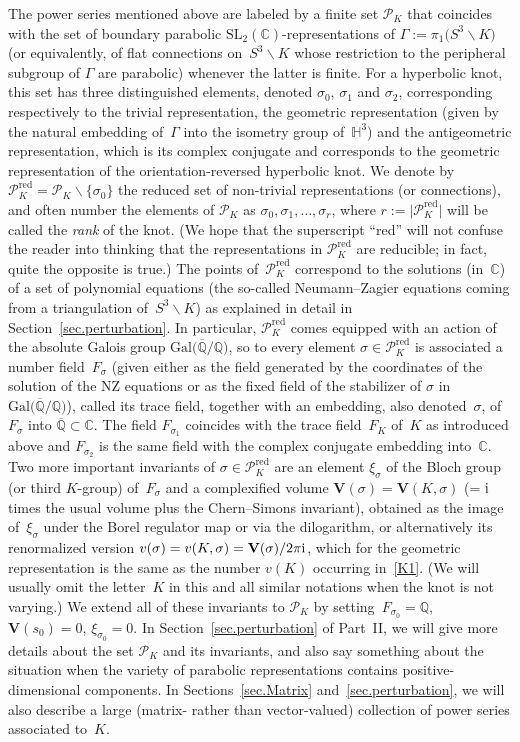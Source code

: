 \documentclass[pdftex]{sigma}
\numberwithin{equation}{section}
\def\BQ{\mathbb Q}
\def\calP{\mathcal P}
\def\calP{\mathcal P}
\def\SL{\mathrm{SL}}
\def\C{\mathbb C}
\def\Q{\mathbb Q}
\def\G{\Gamma}
\def\s{\sigma}
\def\G{\Gamma}
\def\Qbar{\overline{\Q}}
\def\V{\mathbf V}
\def\ssm{\smallsetminus}
\def\RED{^{\text{red}}}
\begin{document}
The power series mentioned above are labeled by a finite set $\calP_K$
that coincides with the set of boundary parabolic $\SL_2(\C)$-representations
of $\G:=\pi_1\big(S^3\ssm K\big)$ (or equivalently, of flat connections
on~$S^3\ssm K$ whose restriction to the peripheral subgroup of $\G$ are
parabolic) whenever the latter is finite. For a hyperbolic knot, this
set has three distinguished elements, denoted $\s_0$, $\s_1$ and $\s_2$,
corresponding respectively to the trivial representation, the geometric
representation (given by the natural embedding of~$\G$ into the isometry group
of~$\mathbb H^3$) and the antigeometric representation, which is its
complex conjugate and corresponds to the geometric representation of the
orientation-reversed hyperbolic knot. We denote by $\calP\RED_K=\calP_K\ssm\{\s_0\}$
the reduced set of non-trivial representations (or connections), and often
number the elements of $\calP_K$ as $\s_0,\s_1,\dots,\s_r$, where
$r:=\big|\calP\RED_K\big|$ will be called the \emph{rank} of the knot. (We hope that the
superscript ``red'' will not confuse the reader into thinking that the representations
in $\calP\RED_K$ are reducible; in fact, quite the opposite is true.)
The points of~$\calP\RED_K$ correspond to the solutions (in~$\C$) of a set of polynomial
equations \big(the so-called Neumann--Zagier equations coming from a triangulation
of~$S^3\ssm K$\big) as explained in detail in Section~\ref{sec.perturbation}.
In particular, $\calP\RED_K$ comes equipped with an action of the absolute
Galois group $\text{Gal}\big(\overline{\BQ}/\BQ\big)$, so to every element
$\s \in \calP\RED_K$ is associated a number field~$F_\s$ \big(given either as the
field generated by the coordinates of the solution of the NZ equations or
as the fixed field of the stabilizer of $\s$ in $\text{Gal}\big(\Qbar/\BQ\big)$\big),
called its trace field, together with an embedding, also denoted~$\s$,
of~$F_\s$ into $\Qbar\subset\C$. The field $F_{\s_1}$
coincides with the trace field~$F_K$ of~$K$ as introduced above and
$F_{\s_2}$ is the same field with the complex conjugate embedding into~$\C$.
Two more important invariants of $\s\in\calP_K\RED$ are an element $\xi_\s$
of the Bloch group (or third $K$-group) of~$F_\s$ and a complexified
volume $\V(\s)=\V(K,\s)$ (= ${\rm i}$ times the usual volume plus the Chern--Simons
invariant), obtained as the image of~$\xi_\s$ under the Borel regulator
map or via the dilogarithm, or alternatively its renormalized version
$v(\s)=v(K,\s)=\V(\s)/2\pi {\rm i}$, which for the geometric representation is
the same as the number $v(K)$ occurring in~\eqref{K1}.
(We will usually omit the letter~$K$ in this and all similar notations when
the knot is not varying.) We extend all of these invariants to $\calP_K$
by setting~$F_{\s_0}=\Q$, $\V(s_0)=0$, $\xi_{\s_0}=0$.
In Section~\ref{sec.perturbation} of Part~II,
we will give more details about the set $\calP_K$ and its invariants, and
also say something about the situation when the variety of parabolic
representations contains positive-dimensional components. In
Sections~\ref{sec.Matrix} and~\ref{sec.perturbation}, we will also describe
a large (matrix- rather than vector-valued) collection of power series
associated to~$K$.
\end{document}
